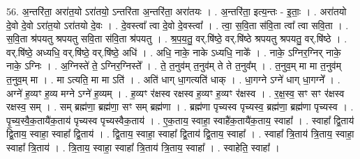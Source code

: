 \documentclass[17pt]{extarticle}
\begin{document}
56. अ॒न्तरि॑ता॒ अरा॑त॒यो ऽरा॑तयो॒ ऽन्तरि॑ता अ॒न्तरि॑ता॒ अरा॑तयः । . अ॒न्तरि॑ता॒ इत्य॒न्तः - इ॒ताः॒ । . अरा॑तयो दे॒वो दे॒वो ऽरा॑त॒यो ऽरा॑तयो दे॒वः । . दे॒वस्त्वा᳚ त्वा दे॒वो दे॒वस्त्वा᳚ । . त्वा॒ स॒वि॒ता स॑वि॒ता त्वा᳚ त्वा सवि॒ता । . स॒वि॒ता श्र॑पयतु श्रपयतु सवि॒ता स॑वि॒ता श्र॑पयतु । . श्र॒प॒य॒तु॒ वर्.षि॑ष्ठे॒ वर्.षि॑ष्ठे श्रपयतु श्रपयतु॒ वर्.षि॑ष्ठे । . वर्.षि॑ष्ठे॒ अध्यधि॒ वर्.षि॑ष्ठे॒ वर्.षि॑ष्ठे॒ अधि॑ । . अधि॒ नाके॒ नाके ऽध्यधि॒ नाके᳚ । . नाके॒ ऽग्निर॒ग्निर् नाके॒ नाके॒ ऽग्निः । . अ॒ग्निस्ते॑ ते॒ ऽग्निर॒ग्निस्ते᳚ । . ते॒ त॒नुव॑म् त॒नुव॑म् ते ते त॒नुव᳚म् । . त॒नुव॒म् मा मा त॒नुव॑म् त॒नुव॒म् मा । . मा ऽत्यति॒ मा मा ऽति॑ । . अति॑ धाग् धा॒गत्यति॑ धाक् । . धा॒गग्ने ऽग्ने॑ धाग् धा॒गग्ने᳚ । . अग्ने॑ ह॒व्यꣳ ह॒व्य मग्ने ऽग्ने॑ ह॒व्यम् । . ह॒व्यꣳ र॑क्षस्व रक्षस्व ह॒व्यꣳ ह॒व्यꣳ र॑क्षस्व । . र॒क्ष॒स्व॒ सꣳ सꣳ र॑क्षस्व रक्षस्व॒ सम् । . सम् ब्रह्म॑णा॒ ब्रह्म॑णा॒ सꣳ सम् ब्रह्म॑णा । . ब्रह्म॑णा पृच्यस्व पृच्यस्व॒ ब्रह्म॑णा॒ ब्रह्म॑णा पृच्यस्व । . पृ॒च्य॒स्वै॒क॒तायै॑क॒ताय॑ पृच्यस्व पृच्यस्वैक॒ताय॑ । . ए॒क॒ताय॒ स्वाहा॒ स्वाहै॑क॒तायै॑क॒ताय॒ स्वाहा᳚ । . स्वाहा᳚ द्वि॒ताय॑ द्वि॒ताय॒ स्वाहा॒ स्वाहा᳚ द्वि॒ताय॑ । . द्वि॒ताय॒ स्वाहा॒ स्वाहा᳚ द्वि॒ताय॑ द्वि॒ताय॒ स्वाहा᳚ । . स्वाहा᳚ त्रि॒ताय॑ त्रि॒ताय॒ स्वाहा॒ स्वाहा᳚ त्रि॒ताय॑ । . त्रि॒ताय॒ स्वाहा॒ स्वाहा᳚ त्रि॒ताय॑ त्रि॒ताय॒ स्वाहा᳚ । . स्वाहेति॒ स्वाहा᳚ । \newline
\end{document}
